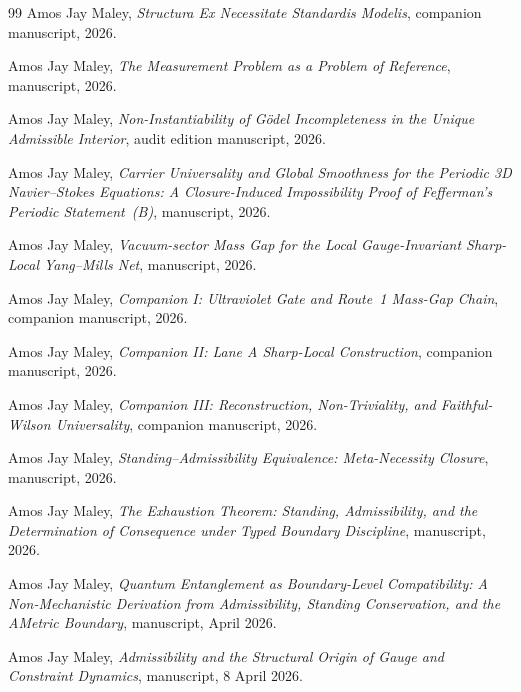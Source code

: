 \begin{thebibliography}{99}
Amos Jay Maley,
\newblock \emph{Structura Ex Necessitate Standardis Modelis},
\newblock companion manuscript, 2026.

Amos Jay Maley,
\newblock \emph{The Measurement Problem as a Problem of Reference},
\newblock manuscript, 2026.

Amos Jay Maley,
\newblock \emph{Non-Instantiability of G\"odel Incompleteness in the Unique Admissible Interior},
\newblock audit edition manuscript, 2026.

Amos Jay Maley,
\newblock \emph{Carrier Universality and Global Smoothness for the Periodic 3D Navier--Stokes Equations: A Closure-Induced Impossibility Proof of Fefferman's Periodic Statement~(B)},
\newblock manuscript, 2026.

Amos Jay Maley,
\newblock \emph{Vacuum-sector Mass Gap for the Local Gauge-Invariant Sharp-Local Yang--Mills Net},
\newblock manuscript, 2026.

Amos Jay Maley,
\newblock \emph{Companion I: Ultraviolet Gate and Route~1 Mass-Gap Chain},
\newblock companion manuscript, 2026.

Amos Jay Maley,
\newblock \emph{Companion II: Lane A Sharp-Local Construction},
\newblock companion manuscript, 2026.

Amos Jay Maley,
\newblock \emph{Companion III: Reconstruction, Non-Triviality, and Faithful-Wilson Universality},
\newblock companion manuscript, 2026.

Amos Jay Maley,
\newblock \emph{Standing--Admissibility Equivalence: Meta-Necessity Closure},
\newblock manuscript, 2026.

Amos Jay Maley,
\newblock \emph{The Exhaustion Theorem: Standing, Admissibility, and the Determination of Consequence under Typed Boundary Discipline},
\newblock manuscript, 2026.

Amos Jay Maley,
\newblock \emph{Quantum Entanglement as Boundary-Level Compatibility: A Non-Mechanistic Derivation from Admissibility, Standing Conservation, and the AMetric Boundary},
\newblock manuscript, April 2026.

Amos Jay Maley,
\newblock \emph{Admissibility and the Structural Origin of Gauge and Constraint Dynamics},
\newblock manuscript, 8 April 2026.


\end{thebibliography}
